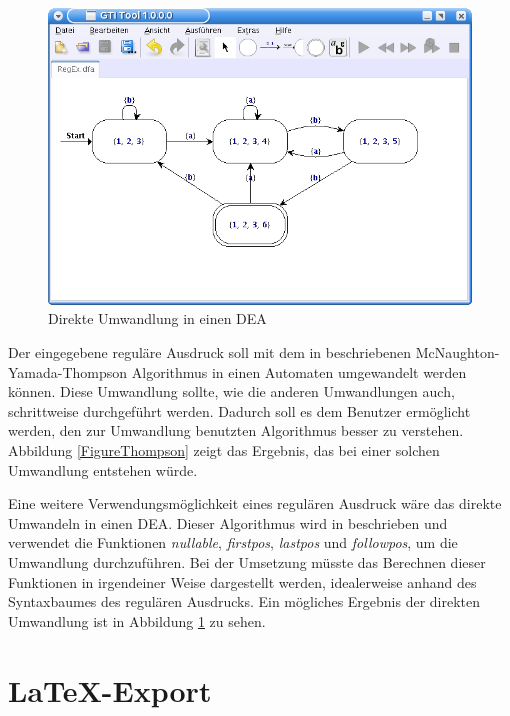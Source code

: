 \begin{figure}[h!]
\begin{center}
\includegraphics[width=12cm]{../images/regex_dfa.png}
\caption{Direkte Umwandlung in einen DEA}
\label{FigureRegExDFA}
\end{center}
\end{figure}
\vspace{10pt}

Der eingegebene reguläre Ausdruck soll mit dem in \cite[S.159ff]{Compilers}
beschriebenen McNaughton-Yamada-Thompson Algorithmus in einen Automaten
umgewandelt werden können. Diese Umwandlung sollte, wie die anderen Umwandlungen
auch, schrittweise durchgeführt werden. Dadurch soll es dem Benutzer ermöglicht
werden, den zur Umwandlung benutzten Algorithmus besser zu verstehen. Abbildung
\ref{FigureThompson} zeigt das Ergebnis, das bei einer solchen Umwandlung
entstehen würde.\vspace{10pt}

Eine weitere Verwendungsmöglichkeit eines regulären Ausdruck wäre das direkte
Umwandeln in einen DEA. Dieser Algorithmus wird in
\cite[S. 175ff]{Compilers} beschrieben und verwendet die Funktionen
\textit{nullable}, \textit{firstpos}, \textit{lastpos} und \textit{followpos},
um die Umwandlung durchzuführen. Bei der Umsetzung müsste das Berechnen dieser
Funktionen in irgendeiner Weise dargestellt werden, idealerweise anhand des
Syntaxbaumes des regulären Ausdrucks. Ein mögliches Ergebnis der direkten
Umwandlung ist in Abbildung \ref{FigureRegExDFA} zu sehen.\vspace{10pt}


\section{\LaTeX-Export}\label{PerspectiveLaTeX}

